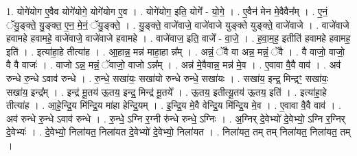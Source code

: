 \documentclass[17pt]{extarticle}
\begin{document}
1. योगे॑योग ए॒वैव योगे॑योगे॒ योगे॑योग ए॒व । . योगे॑योग॒ इति॒ योगे᳚ - यो॒गे॒ । . ए॒वैन॑ मेन मे॒वैवैन᳚म् । . ए॒नं॒ ॅयु॒ङ्क्ते॒ यु॒ङ्क्त॒ ए॒न॒ मे॒नं॒ ॅयु॒ङ्क्ते॒ । . यु॒ङ्क्ते॒ वाजे॑वाजे॒ वाजे॑वाजे युङ्क्ते युङ्क्ते॒ वाजे॑वाजे । . वाजे॑वाजे हवामहे हवामहे॒ वाजे॑वाजे॒ वाजे॑वाजे हवामहे । . वाजे॑वाज॒ इति॒ वाजे᳚ - वा॒जे॒ । . ह॒वा॒म॒ह॒ इतीति॑ हवामहे हवामह॒ इति॑ । . इत्या॑हा॒हे तीत्या॑ह । . आ॒हान्न॒ मन्न॑ माहा॒हा न्न᳚म् । . अन्नं॒ ॅवै वा अन्न॒ मन्नं॒ ॅवै । . वै वाजो॒ वाजो॒ वै वै वाजः॑ । . वाजो ऽन्न॒ मन्नं॒ ॅवाजो॒ वाजो ऽन्न᳚म् । . अन्न॑ मे॒वैवान्न॒ मन्न॑ मे॒व । . ए॒वावा वै॒वै वाव॑ । . अव॑ रुन्धे रु॒न्धे ऽवाव॑ रुन्धे । . रु॒न्धे॒ सखा॑यः॒ सखा॑यो रुन्धे रुन्धे॒ सखा॑यः । . सखा॑य॒ इन्द्र॒ मिन्द्रꣳ॒॒ सखा॑यः॒ सखा॑य॒ इन्द्र᳚म् । . इन्द्र॑ मू॒तय॑ ऊ॒तय॒ इन्द्र॒ मिन्द्र॑ मू॒तये᳚ । . ऊ॒तय॒ इतीत्यू॒तय॑ ऊ॒तय॒ इति॑ । . इत्या॑हा॒हे तीत्या॑ह । . आ॒हे॒न्द्रि॒य मि॑न्द्रि॒य मा॑हा हेन्द्रि॒यम् । . इ॒न्द्रि॒य मे॒वै वेन्द्रि॒य मि॑न्द्रि॒य मे॒व । . ए॒वावा वै॒वै वाव॑ । . अव॑ रुन्धे रु॒न्धे ऽवाव॑ रुन्धे । . रु॒न्धे॒ ऽग्नि र॒ग्नी रु॑न्धे रुन्धे॒ ऽग्निः । . अ॒ग्निर् दे॒वेभ्यो॑ दे॒वेभ्यो॒ ऽग्नि र॒ग्निर् दे॒वेभ्यः॑ । . दे॒वेभ्यो॒ निला॑यत॒ निला॑यत दे॒वेभ्यो॑ दे॒वेभ्यो॒ निला॑यत । . निला॑यत॒ तम् तम् निला॑यत॒ निला॑यत॒ तम् । \newline
\end{document}
